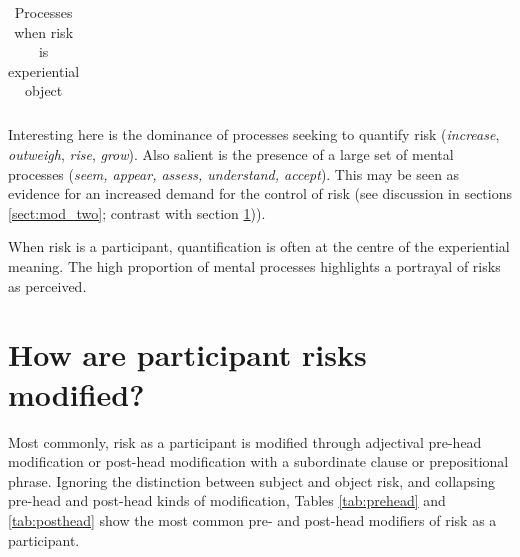 \begin{table}[htb!]
{\begin{minipage}{.35\textwidth}
\begin{tabularx}{1.0\textwidth}{|>{\raggedright}X|l|}
    \end{tabularx}
    \caption{Processes when risk is experiential object}
    \label{tab:obj}
    \end{minipage}}
    \end{table}

    Interesting here is the dominance of processes seeking to quantify risk (\emph{increase}, \emph{outweigh}, \emph{rise}, \emph{grow}). Also salient is the presence of a large set of mental processes (\emph{seem, appear, assess, understand, accept}). This may be seen as evidence for an increased demand for the control of risk (see discussion in sections \ref{sect:mod_two}; contrast with section \ref{sect:highpotential})).


    \vspace{5mm}\noindent\begin{tcolorbox}[colback=yellow!5,colframe=yellow!40!black,title=Summary: processes with risk participants]
    \parbox{1\textwidth}{%
    When risk is a participant, quantification is often at the centre of the experiential meaning. The high proportion of mental processes highlights a portrayal of risks as perceived.}
    \end{tcolorbox}
    \vspace{5mm}

\section{How are participant risks modified?} \label{sect:highpotential} \FloatBarrier

    Most commonly, risk as a participant is modified through adjectival pre-head modification or post-head modification with a subordinate clause or prepositional phrase. Ignoring the distinction between subject and object risk, and collapsing pre-head and post-head kinds of modification, Tables \ref{tab:prehead} and \ref{tab:posthead} show the most common pre- and post-head modifiers of risk as a participant.

